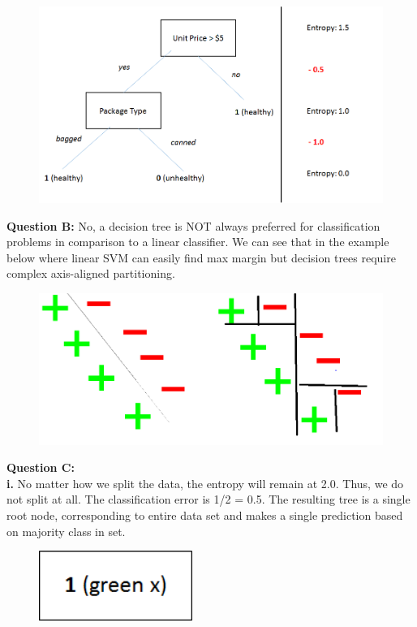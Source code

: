 \documentclass[12 pt]{article}
\begin{document}
	\begin{figure}[H]
		\includegraphics[width=17cm]{tree2}
	\end{figure}
	\noindent\textbf{Question B:} No, a decision tree is NOT always preferred for classification problems in comparison to a linear classifier. We can see that in the example below where linear SVM can easily find max margin but decision trees require complex axis-aligned partitioning.  \\
	\begin{figure}[H]
	\includegraphics[width=17cm]{treesvm}
	\end{figure}	
	\noindent\textbf{Question C:}  \\\textbf{i.} No matter how we split the data, the entropy will remain at 2.0. Thus, we do not split at all. The classification error is 1/2 = 0.5. The resulting tree is a single root node, corresponding to entire data set and makes a single prediction based on majority class in set. \\
	\begin{figure}[H]
		\includegraphics[width=5cm]{smallTree}
	\end{figure}	
\end{document}
